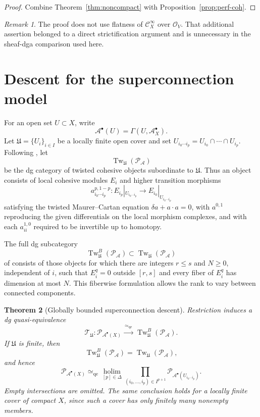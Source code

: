 \documentclass[12pt]{amsart}
\newtheorem{thm}{Theorem}[section]
\theoremstyle{definition}
\theoremstyle{remark}
\newtheorem{rem}[thm]{Remark}
\numberwithin{equation}{section}
\newcommand{\CA}{\mathcal A}
\newcommand{\CO}{\mathcal O}
\newcommand{\cinf}{\mathcal C^\infty}
\begin{document}
\begin{proof}
Combine Theorem~\ref{thm:noncompact} with
Proposition~\ref{prop:perf-coh}.
\end{proof}

\begin{rem}
The proof does not use flatness of \(\cinf_X\) over \(\CO_V\).  That
additional assertion belonged to a direct strictification argument and is
unnecessary in the sheaf-dga comparison used here.
\end{rem}

\section{Descent for the superconnection model}\label{sec:descent}

For an open set \(U\subset X\), write
\[
\CA^\bullet(U)=\Gamma(U,\CA_X^\bullet).
\]
Let \(\mathfrak U=\{U_i\}_{i\in I}\) be a locally finite open cover and set
\(U_{i_0\cdots i_p}=U_{i_0}\cap\cdots\cap U_{i_p}\).
Following \cite[Definition~3.1]{Wei2023}, let
\[
\operatorname{Tw}_{\mathfrak U}(\mathcal P_{\CA})
\]
be the dg category of twisted cohesive objects subordinate to
\(\mathfrak U\).  Thus an object consists of local cohesive modules \(E_i\)
and higher transition morphisms
\[
a^{p,1-p}_{i_0\cdots i_p}:
E_{i_p}|_{U_{i_0\cdots i_p}}
\longrightarrow
E_{i_0}|_{U_{i_0\cdots i_p}}
\]
satisfying the twisted Maurer--Cartan equation
\(\delta a+a\cdot a=0\), with \(a^{0,1}\) reproducing the given
differentials on the local morphism complexes, and with each
\(a^{1,0}_{ii}\) required to be invertible up to homotopy.

The full dg subcategory
\[
\operatorname{Tw}^B_{\mathfrak U}(\mathcal P_{\CA})
\subset
\operatorname{Tw}_{\mathfrak U}(\mathcal P_{\CA})
\]
of \cite[Definition~3.5]{Wei2023} consists of those objects for which there
are integers \(r\leq s\) and
\(N\geq0\), independent of \(i\), such that \(E_i^q=0\) outside
\([r,s]\) and every fiber of \(E_i^q\) has dimension at most \(N\).
This fiberwise formulation allows the rank to vary between connected
components.

\begin{thm}[Globally bounded superconnection descent]
\label{thm:eis-cohesive-descent}
Restriction induces a dg quasi-equivalence
\[
\mathcal T_{\mathfrak U}:
\mathcal P_{\CA^\bullet(X)}
\xrightarrow{\ \simeq_{\mathrm{qe}}\ }
\operatorname{Tw}^B_{\mathfrak U}(\mathcal P_{\CA}).
\]
If \(\mathfrak U\) is finite, then
\[
\operatorname{Tw}^B_{\mathfrak U}(\mathcal P_{\CA})
=
\operatorname{Tw}_{\mathfrak U}(\mathcal P_{\CA}),
\]
and hence
\[
\mathcal P_{\CA^\bullet(X)}
\simeq_{\mathrm{qe}}
\operatorname*{holim}_{[p]\in\Delta}
\prod_{(i_0,\ldots,i_p)\in I^{p+1}}
\mathcal P_{\CA^\bullet(U_{i_0\cdots i_p})}.
\]
Empty intersections are omitted.  The same conclusion holds for a locally
finite cover of compact \(X\), since such a cover has only finitely many
nonempty members.
\end{thm}
\end{document}
